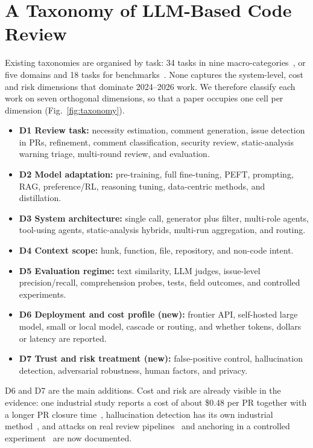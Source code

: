 \section{A Taxonomy of LLM-Based Code Review}\label{sec:taxonomy}

Existing taxonomies are organised by task: 34 tasks in nine macro-categories~\cite{tufano2025automating}, or five domains and 18 tasks for benchmarks~\cite{khan2026survey}. None captures the system-level, cost and risk dimensions that dominate 2024--2026 work. We therefore classify each work on seven orthogonal dimensions, so that a paper occupies one cell per dimension (Fig.~\ref{fig:taxonomy}).

\begin{itemize}
\item \textbf{D1 Review task:} necessity estimation, comment generation, issue detection in PRs, refinement, comment classification, security review, static-analysis warning triage, multi-round review, and evaluation.
\item \textbf{D2 Model adaptation:} pre-training, full fine-tuning, PEFT, prompting, RAG, preference/RL, reasoning tuning, data-centric methods, and distillation.
\item \textbf{D3 System architecture:} single call, generator plus filter, multi-role agents, tool-using agents, static-analysis hybrids, multi-run aggregation, and routing.
\item \textbf{D4 Context scope:} hunk, function, file, repository, and non-code intent.
\item \textbf{D5 Evaluation regime:} text similarity, LLM judges, issue-level precision/recall, comprehension probes, tests, field outcomes, and controlled experiments.
\item \textbf{D6 Deployment and cost profile (new):} frontier API, self-hosted large model, small or local model, cascade or routing, and whether tokens, dollars or latency are reported.
\item \textbf{D7 Trust and risk treatment (new):} false-positive control, hallucination detection, adversarial robustness, human factors, and privacy.
\end{itemize}

D6 and D7 are the main additions. Cost and risk are already visible in the evidence: one industrial study reports a cost of about \$0.48 per PR together with a longer PR closure time~\cite{cihan2025automated}, hallucination detection has its own industrial method~\cite{tantithamthavorn2026hallujudge}, and attacks on real review pipelines~\cite{alexopoulos2026when,isbarov2026gitinject} and anchoring in a controlled experiment~\cite{tufano2025deep} are now documented.

